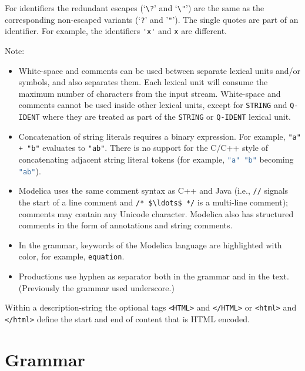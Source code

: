 For identifiers the redundant escapes (`\lstinline!\?!' and `\lstinline!\"!') are the same as the corresponding non-escaped variants (`\lstinline!?!' and '\lstinline!"!').
The single quotes are part of an identifier.
For example, the identifiers \lstinline!'x'! and \lstinline!x! are different.

Note:
\begin{itemize}
\item
  White-space and comments can be used between separate lexical units and/or symbols, and also separates them. Each lexical unit will consume the maximum number of characters from the input stream.
  White-space and comments cannot be used inside other lexical units, except for \lstinline[language=grammar]!STRING! and \lstinline[language=grammar]!Q-IDENT! where they are treated as part of the \lstinline[language=grammar]!STRING! or \lstinline[language=grammar]!Q-IDENT! lexical unit.
\item
  Concatenation of string literals requires a binary expression.
  For example, \lstinline!"a" + "b"! evaluates to \lstinline!"ab"!.
  There is no support for the C/C++ style of concatenating adjacent string literal tokens (for example, \lstinline[language=C]!"a" "b"! becoming \lstinline[language=C]!"ab"!).
\item
  Modelica uses the same comment syntax as C++ and Java (i.e., \lstinline!//! signals the start of a line comment and \lstinline!/* $\ldots$ */! is a multi-line comment); comments may contain any Unicode character.
  Modelica also has structured comments in the form of annotations and string comments.
\item
  In the grammar, keywords of the Modelica language are highlighted with color, for example, \lstinline[language=grammar]!equation!.
\item
  Productions use hyphen as separator both in the grammar and in the text.
  (Previously the grammar used underscore.)
\end{itemize}

\begin{nonnormative}
Within a description-string the optional tags \lstinline!<HTML>! and \lstinline!</HTML>! or \lstinline!<html>! and \lstinline!</html>! define the start and end of content that is HTML encoded.
\end{nonnormative}


\section{Grammar}\label{grammar}

